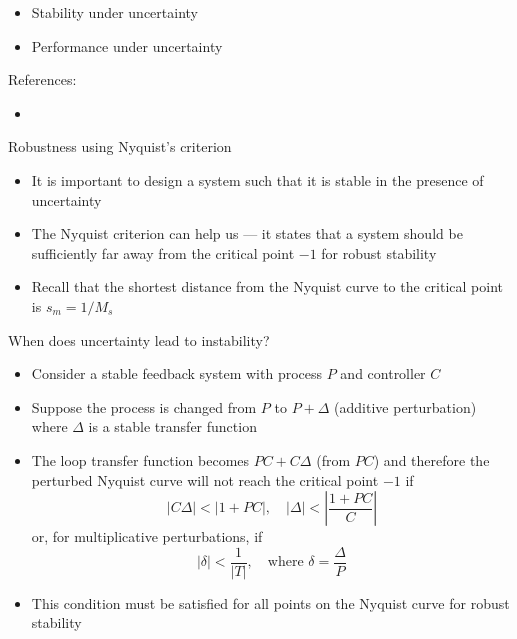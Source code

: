 \documentclass{beamer-control}
\begin{document}

\begin{SUMMARY}
\begin{itemize}
\item Stability under uncertainty
\item Performance under uncertainty
\end{itemize}
\vfill References:
\begin{itemize}
\item {}
\end{itemize}
\end{SUMMARY}




\begin{frame}{Robustness using Nyquist's criterion}
\begin{itemize}
\item It is important to design a system such that it is stable in the presence of uncertainty
\item The Nyquist criterion can help us --- it states that a system should be sufficiently far away from the critical point $-1$ for robust stability
\item Recall that the shortest distance from the Nyquist curve to the critical point is $s_m=1/M_s$
\end{itemize}
\end{frame}


\begin{frame}{When does uncertainty lead to instability?}
	\begin{itemize}
		\item Consider a stable feedback system with process $P$ and controller $C$
		\item Suppose the process is changed from $P$ to $P+\Delta$ (additive perturbation) where $\Delta$ is a stable transfer function
		\item The loop transfer function becomes $PC+C\Delta$ (from $PC$) and therefore the perturbed Nyquist curve will not reach the critical point $-1$ if
		\[|C\Delta|<|1+PC|, \quad |\Delta| <\left|\frac{1+PC}{C}\right|\]
		or, for multiplicative perturbations, if
		\[|\delta|<\frac{1}{|T|}, \quad \text{where } \delta=\frac{\Delta}{P}\]
		\item This condition must be satisfied for all points on the Nyquist curve for robust stability %
	\end{itemize}
\end{frame}
\end{document}
